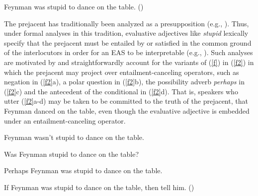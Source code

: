 \documentclass[11pt,fleqn]{article}
\newcommand{\6}{\mbox{$[\hspace*{-.6mm}[$}}
\newcommand{\9}{\mbox{$]\hspace*{-.6mm}]$}}
\begin{document}
\begin{exe} 
\ex\label{f} Feynman was stupid to dance on the table. \hfill (\citealt[18]{barker02})
\end{exe} 
The prejacent has traditionally been analyzed as a presupposition (e.g., \citealt{norrick78,barker02,oshima09b,kertz2010}). Thus, under formal analyses in this tradition, evaluative adjectives like {\em stupid} lexically specify that the prejacent
must be entailed by or satisfied in the common ground of the interlocutors in
order for an EAS to be interpretable (e.g.,
\citealt{heim83,vds92}). Such analyses are motivated by and straightforwardly account for the variants of (\ref{f}) in (\ref{f2}) in which the prejacent may project over entailment-canceling operators, such as negation in (\ref{f2}a), a polar question in (\ref{f2}b), the possibility adverb {\em perhaps} in (\ref{f2}c) and the antecedent of the conditional in (\ref{f2}d). That is, speakers who utter (\ref{f2}a-d) may be taken to be committed to the truth of the prejacent, that Feynman danced on the table, even though the evaluative adjective is embedded under an entailment-canceling operator. 

\begin{exe}

\ex\label{f2} 

\begin{xlist}

\ex Feynman wasn't stupid to dance on the table.

\ex Was Feynman stupid to dance on the table?

\ex Perhaps Feynman was stupid to dance on the table.

\ex If Feynman was stupid to dance on the table, then tell him. \hfill (\citealt[18f.]{barker02})

\end{xlist}
\end{exe}
\end{document}
